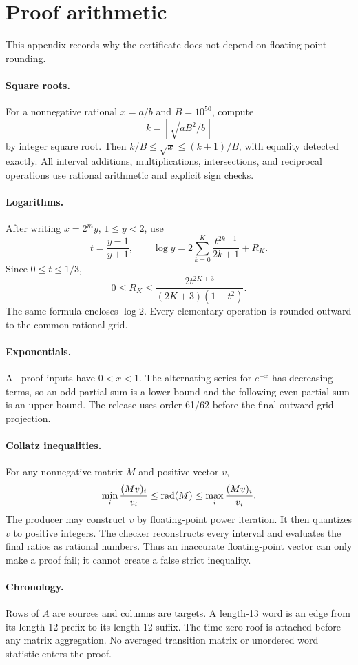 \section{Proof arithmetic}
\label{app:arithmetic}

This appendix records why the certificate does not depend on floating-point
rounding.

\paragraph{Square roots.}
For a nonnegative rational \(x=a/b\) and \(B=10^{50}\), compute
\[
 k=\left\lfloor\sqrt{aB^2/b}\right\rfloor
\]
by integer square root.  Then
\(k/B\le\sqrt{x}\le(k+1)/B\), with equality detected exactly.  All interval
additions, multiplications, intersections, and reciprocal operations use
rational arithmetic and explicit sign checks.

\paragraph{Logarithms.}
After writing \(x=2^m y\), \(1\le y<2\), use
\[
 t=\frac{y-1}{y+1},\qquad
 \log y=2\sum_{k=0}^{K}\frac{t^{2k+1}}{2k+1}+R_K.
\]
Since \(0\le t\le1/3\),
\[
 0\le R_K
 \le\frac{2t^{2K+3}}{(2K+3)(1-t^2)}.
\]
The same formula encloses \(\log2\).  Every elementary operation is rounded
outward to the common rational grid.

\paragraph{Exponentials.}
All proof inputs have \(0<x<1\).  The alternating series for \(e^{-x}\)
has decreasing terms, so an odd partial sum is a lower bound and the following
even partial sum is an upper bound.  The release uses order 61/62 before the
final outward grid projection.

\paragraph{Collatz inequalities.}
For any nonnegative matrix \(M\) and positive vector \(v\),
\[
 \min_i\frac{(Mv)_i}{v_i}
 \le\operatorname{rad}(M)\le
 \max_i\frac{(Mv)_i}{v_i}.
\]
The producer may construct \(v\) by floating-point power iteration.  It then
quantizes \(v\) to positive integers.  The checker reconstructs every interval
and evaluates the final ratios as rational numbers.  Thus an inaccurate
floating-point vector can only make a proof fail; it cannot create a false
strict inequality.

\paragraph{Chronology.}
Rows of \(A\) are sources and columns are targets.  A length-13 word is an
edge from its length-12 prefix to its length-12 suffix.  The time-zero roof is
attached before any matrix aggregation.  No averaged transition matrix or
unordered word statistic enters the proof.
